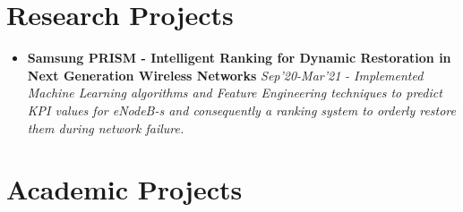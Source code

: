 \documentclass{article}
\begin{document}
\section*{Research Projects}
\begin{itemize}
    \item{\textbf{\large{Samsung PRISM - Intelligent Ranking for Dynamic Restoration in
                  Next Generation Wireless Networks}}} \hfill \textit{Sep'20-Mar'21}
          \newline
          \textit{- Implemented Machine Learning algorithms and Feature Engineering techniques to predict KPI values for eNodeB-s and consequently a ranking system
              to orderly restore them during network failure.}
\end{itemize}

\section*{Academic Projects}
\end{document}
